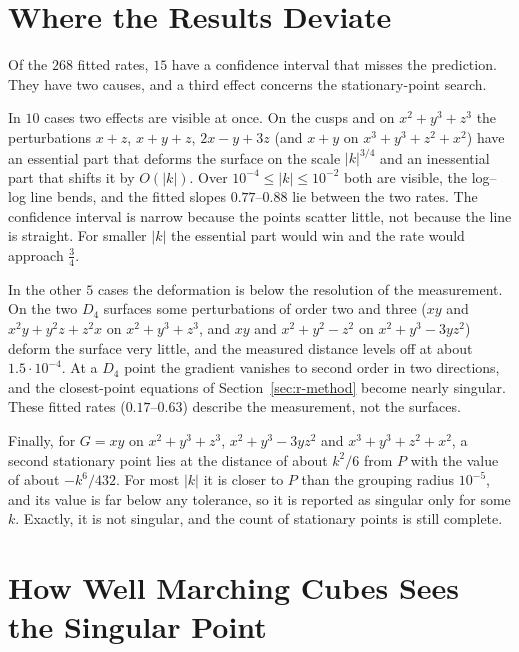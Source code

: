\documentclass[12pt, a4paper, oneside]{book}
\theoremstyle{plain}
\theoremstyle{definition}
\theoremstyle{remark}
\theoremstyle{definition}
\begin{document}
\section{Where the Results Deviate}
\label{sec:r-deviations}

Of the $268$ fitted rates, $15$ have a confidence interval that misses the prediction. They have two causes, and a third effect concerns the stationary-point search.

In $10$ cases two effects are visible at once. On the cusps and on $x^2+y^3+z^3$ the perturbations $x+z$, $x+y+z$, $2x-y+3z$ (and $x+y$ on $x^3+y^3+z^2+x^2$) have an essential part that deforms the surface on the scale $|k|^{3/4}$ and an inessential part that shifts it by $O(|k|)$. Over $10^{-4}\le|k|\le10^{-2}$ both are visible, the log--log line bends, and the fitted slopes $0.77$--$0.88$ lie between the two rates. The confidence interval is narrow because the points scatter little, not because the line is straight. For smaller $|k|$ the essential part would win and the rate would approach $\tfrac34$.

In the other $5$ cases the deformation is below the resolution of the measurement. On the two $D_4$ surfaces some perturbations of order two and three ($xy$ and $x^2y+y^2z+z^2x$ on $x^2+y^3+z^3$, and $xy$ and $x^2+y^2-z^2$ on $x^2+y^3-3yz^2$) deform the surface very little, and the measured distance levels off at about $1.5\cdot10^{-4}$. At a $D_4$ point the gradient vanishes to second order in two directions, and the closest-point equations of Section~\ref{sec:r-method} become nearly singular. These fitted rates ($0.17$--$0.63$) describe the measurement, not the surfaces.

Finally, for $G=xy$ on $x^2+y^3+z^3$, $x^2+y^3-3yz^2$ and $x^3+y^3+z^2+x^2$, a second stationary point lies at the distance of about $k^2/6$ from $P$ with the value of about $-k^6/432$. For most $|k|$ it is closer to $P$ than the grouping radius $10^{-5}$, and its value is far below any tolerance, so it is reported as singular only for some $k$. Exactly, it is not singular, and the count of stationary points is still complete.

\section{How Well Marching Cubes Sees the Singular Point}
\label{sec:r-accuracy}
\end{document}
